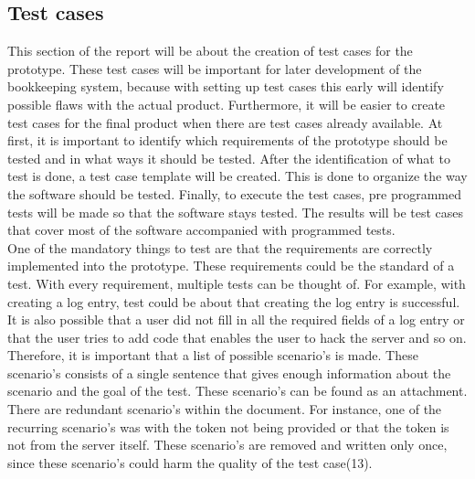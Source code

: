 \documentclass[paper=a4, fontsize=11pt,twoside]{scrartcl}	%
\begin{document}
\subsection{Test cases}
This section of the report will be about the creation of test cases for the prototype. These test cases will be important for later development of the bookkeeping system, because with setting up test cases this early will identify possible flaws with the actual product.
Furthermore, it will be easier to create test cases for the final product when there are test cases already available. At first, it is important to identify which requirements of the prototype should be tested and in what ways it should be tested. After the identification of what to test is done, a test case template will be created. This is done to organize the way the software should be tested. Finally, to execute the test cases, pre programmed tests will be made so that the software stays tested. The results will be test cases that cover most of the software accompanied with programmed tests. \\
One of the mandatory things to test are that the requirements are correctly implemented into the prototype. These requirements could be the standard of a test. With every requirement, multiple tests can be thought of. For example, with creating a log entry, test could be about that creating the log entry is successful. It is also possible that a user did not fill in all the required fields of a log entry or that the user tries to add code that enables the user to hack the server and so on. Therefore, it is important that a list of possible scenario's is made. These scenario's consists of a single sentence that gives enough information about the scenario and the goal of the test. These scenario's can be found as an attachment. There are redundant scenario's within the document. For instance, one of the recurring scenario's was with the token not being provided or that the token is not from the server itself. These scenario's are removed and written only once, since these scenario's could harm the quality of the test case(13). \\
\end{document}
